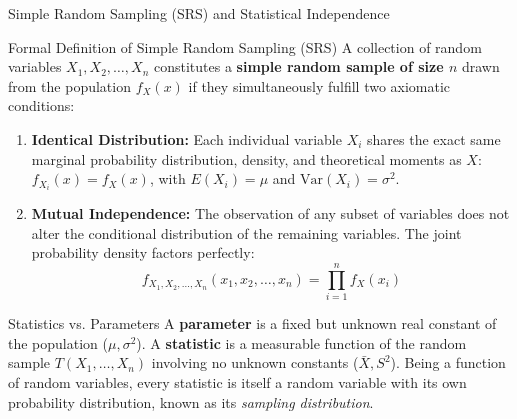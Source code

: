 \documentclass[10pt, aspectratio=169]{beamer}
\begin{document}
\begin{frame}{Simple Random Sampling (SRS) and Statistical Independence}
  \fontsize{7.5pt}{9pt}\selectfont
  \begin{block}{Formal Definition of Simple Random Sampling (SRS)}
    \fontsize{7.5pt}{9pt}\selectfont
    A collection of random variables $X_1, X_2, \ldots, X_n$ constitutes a \textbf{simple random sample of size $n$} drawn from the population $f_X(x)$ if they simultaneously fulfill two axiomatic conditions:
    \begin{enumerate}\itemsep=0.1cm
      \item \textbf{Identical Distribution:} Each individual variable $X_i$ shares the exact same marginal probability distribution, density, and theoretical moments as $X$: $f_{X_i}(x) = f_X(x)$, with $E(X_i) = \mu$ and $\text{Var}(X_i) = \sigma^2$.
      \item \textbf{Mutual Independence:} The observation of any subset of variables does not alter the conditional distribution of the remaining variables. The joint probability density factors perfectly:
      $$f_{X_1, X_2, \ldots, X_n}(x_1, x_2, \ldots, x_n) = \prod_{i=1}^n f_X(x_i)$$
    \end{enumerate}
  \end{block}
  \vspace{-0.15cm}
  \pause
  \begin{alertblock}{Statistics vs. Parameters}
    \fontsize{7.5pt}{9pt}\selectfont
    A \textbf{parameter} is a fixed but unknown real constant of the population ($\mu, \sigma^2$). A \textbf{statistic} is a measurable function of the random sample $T(X_1, \ldots, X_n)$ involving no unknown constants ($\bar{X}, S^2$). Being a function of random variables, every statistic is itself a random variable with its own probability distribution, known as its \emph{sampling distribution}.
  \end{alertblock}
\end{frame}
\end{document}
